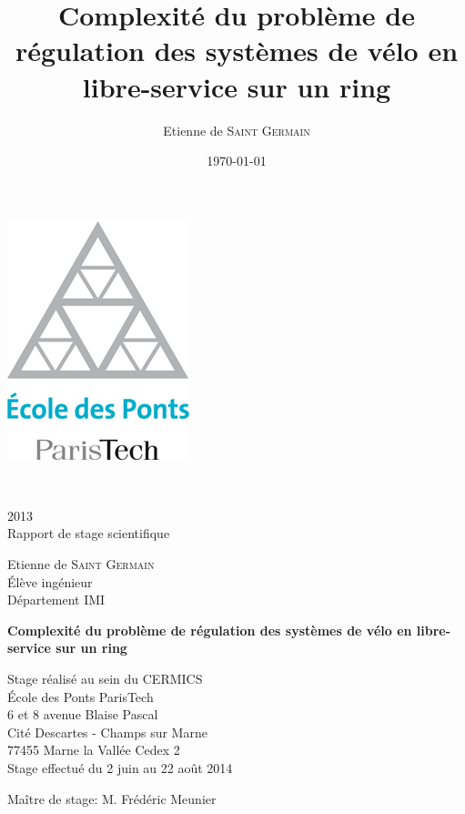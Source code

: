 \documentclass[twoside,10pt,openany,a4paper]{rapport}
\begin{document}
\title{Complexité du problème de régulation des systèmes de vélo en libre-service sur un ring}
\author{Etienne de \textsc{Saint Germain}}
\date{\today}

\mainmatter

\begin{titlepage}
  \begin{center}
    \includegraphics[scale=0.5]{logo_enpc.jpg}
    
    \vspace{0.3cm}
    \\
    
    \vspace{0.7cm}
    2013\\
    Rapport de stage scientifique
    
    \vspace{0.3cm}
    Etienne de \textsc{Saint Germain}\\
    Élève ingénieur\\
    Département IMI
    
    \vspace{2cm}
    {\Huge{\textbf{Complexité du problème de régulation des systèmes de vélo en libre-service sur un ring}}}
    
    \vfill
    {\huge{Stage réalisé au sein du CERMICS}}\\
    École des Ponts ParisTech\\
    6 et 8 avenue Blaise Pascal\\
    Cité Descartes - Champs sur Marne\\
    77455 Marne la Vallée Cedex 2\\

    \vspace{0.7cm}
    Stage effectué du 2 juin au 22 août 2014
    
    \vspace{0.3cm}
    Maître de stage: M. Frédéric Meunier

  \end{center}
\end{titlepage}
\end{document}
